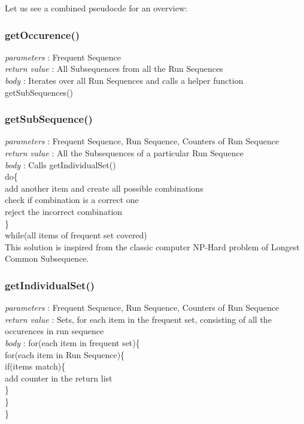 Let us see a combined pseudocde for an overview:
\subsubsection{getOccurence()}
\tab\emph{parameters} : Frequent Sequence\\
\tab\emph{return value} : All Subsequences from all the Run Sequences\\
\tab\emph{body} : Iterates over all Run Sequences and calls a helper function getSubSequences()

\subsubsection{getSubSequence()}
\tab\emph{parameters} : Frequent Sequence, Run Sequence, Counters of Run Sequence\\
\tab\emph{return value} : All the Subsequences of a particular Run Sequence\\
\tab\emph{body} : Calls getIndividualSet()\\
\tab\tab\tab 		        do\{\\
\tab\tab\tab\tab				add another item and create all possible combinations\\
\tab\tab\tab\tab				check if combination is a correct one\\
\tab\tab\tab\tab				reject the incorrect combination\\
\tab\tab\tab			\}\\
\tab\tab\tab			while(all items of frequent set covered)\\
This solution is inspired from the classic computer NP-Hard problem of Longest Common Subsequence\cite{lcs}.

			
\subsubsection{getIndividualSet()}
\tab\emph{parameters} : Frequent Sequence, Run Sequence, Counters of Run Sequence\\
\tab\emph{return value} : Sets, for each item in the frequent set, consisting of all the occurences in run sequence\\
\tab\emph{body} : for(each item in frequent set)\{\\
\tab\tab\tab 			for(each item in Run Sequence)\{\\
\tab\tab\tab\tab			if(items match)\{\\
\tab\tab\tab\tab\tab			add counter in the return list\\
\tab\tab\tab\tab 			\}\\
\tab\tab\tab 			\}\\
\tab\tab 		\}\\
				
